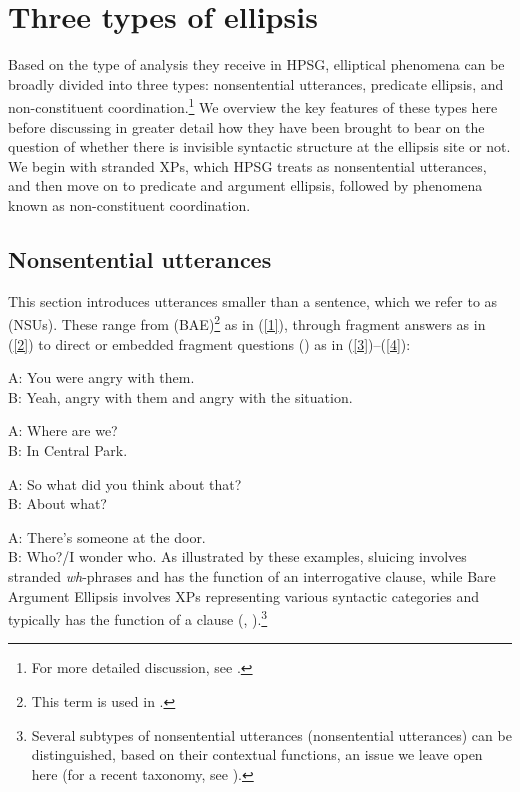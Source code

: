 \section{Three types of ellipsis}
\label{sec-three-types-of-ellipsis}

Based on the type of analysis they receive in HPSG, elliptical phenomena can be broadly divided into
three types: nonsentential utterances, predicate ellipsis, and non-constituent
coordination.\footnote{For more detailed discussion, see \citet{Kim2020}.}  We overview the key
features of these types here before discussing in greater detail how they have been brought to bear
on the question of whether there is invisible syntactic structure at the ellipsis site or not. We
begin with stranded XPs, which HPSG treats as nonsentential utterances, and then move on to
predicate and argument ellipsis, followed by phenomena known as non-constituent coordination.


\subsection{Nonsentential utterances}

This section introduces utterances smaller than a sentence, which we refer to as \emph{} (NSUs). These range from \emph{} (BAE)\footnote{This term is used in \citet[6]{CJ2005a}.} as in (\ref{1}), through fragment answers as in (\ref{2})
to direct or embedded fragment questions () as in (\ref{3})--(\ref{4}):

\ea A: You were angry with them.\\ B: Yeah, angry with them and angry with the situation.\label{1}\z

\ea A: Where are we? \\B: In Central Park.\label{2}\z

\ea A: So what did you think about that?\\ B: About what? \label{3}\z

\ea A: There's someone at the door. \\B: Who?/I wonder who. \label{4}\z
%
As illustrated by these examples, sluicing involves stranded \emph{wh}-phrases and has the function of an interrogative clause, while Bare Argument Ellipsis involves XPs representing various syntactic categories and typically has the function of a clause (\citealt[313]{Ginzburg:Sag:2000}, \citealt[233]{CJ2005a}).\footnote{Several subtypes of nonsentential utterances (nonsentential utterances) can be distinguished, based on their contextual functions, an issue we leave open here (for a recent taxonomy, see \citealt[217]{Ginzburg2012}).}

